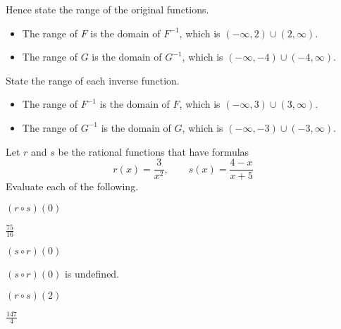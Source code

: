 \begin{exercises}
\begin{problem}
\begin{subproblem}
\end{subproblem}
\begin{subproblem}
	Hence state the range of the original functions.
	\begin{shortsolution}
		\begin{itemize}
			\item The range of $F$ is the domain of $F^{-1}$, which is $(-\infty,2)\cup(2,\infty)$.
			\item The range of $G$ is the domain of $G^{-1}$, which is $(-\infty,-4)\cup(-4,\infty)$.
		\end{itemize}
	\end{shortsolution}
\end{subproblem}
\begin{subproblem}
	State the range of each inverse function. 
	\begin{shortsolution}
		\begin{itemize}
			\item The range of $F^{-1}$ is the domain of $F$, which is $(-\infty,3)\cup(3,\infty)$.
			\item The range of $G^{-1}$ is the domain of $G$, which is $(-\infty,-3)\cup(-3,\infty)$.
		\end{itemize}
	\end{shortsolution}
\end{subproblem}
\end{problem}
\begin{problem}[Composition]
Let $r$ and $s$ be the rational functions that have formulas
\[
	r(x)=\frac{3}{x^2},\qquad s(x)=\frac{4-x}{x+5}
\]
Evaluate each of the following.
\begin{multicols}{3}
	\begin{subproblem}
		$(r\circ s)(0)$
		\begin{shortsolution}
			$\frac{75}{16}$ 
		\end{shortsolution}
	\end{subproblem}
	\begin{subproblem}
		$(s\circ r)(0)$ 
		\begin{shortsolution}
			$(s\circ r)(0)$ is undefined.
		\end{shortsolution}
	\end{subproblem}
	\begin{subproblem}
		$(r\circ s)(2)$ 
		\begin{shortsolution}
			$\frac{147}{4}$ 
		\end{shortsolution}

\end{subproblem}
\end{multicols}
\end{problem}
\end{exercises}
